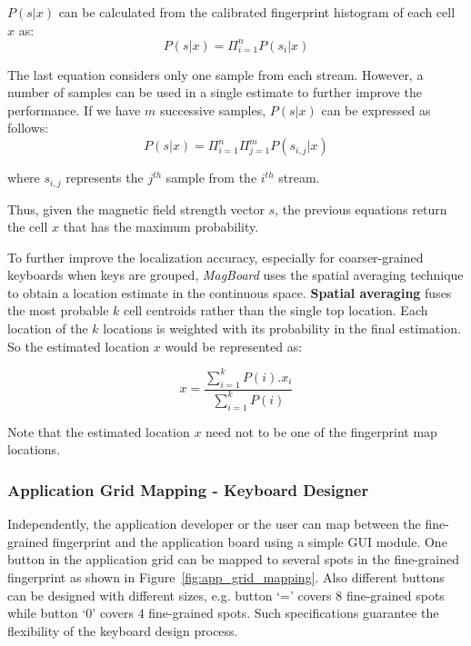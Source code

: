 \documentclass[conference]{IEEEtran}
\def \sys {\textit{MagBoard}}
\begin{document}
$P(s|x)$ can be calculated from the calibrated fingerprint histogram of each cell $x$ as:
\begin{equation}
P(s|x) = \Pi^n_{i=1} P(s_{i}|x)
\end{equation}

The last equation considers only one sample from each stream. However, a number of samples can be used in a single estimate to further improve the performance. If we have $m$ successive samples, $P(s|x)$ can be expressed as follows:
\begin{equation}
P(s|x) = \Pi^n_{i=1}\Pi^m_{j=1} P(s_{i,j}|x)
\label{equ:sample_stream}
\end{equation}

where $s_{i,j}$ represents the $j^{th}$ sample from the $i^{th}$ stream.

Thus, given the magnetic field strength vector $s$, the previous equations return the cell $x$ that has the maximum probability.

To further improve the localization accuracy, especially for coarser-grained keyboards when keys are grouped, \sys{} uses the spatial averaging technique to obtain a location estimate in the continuous space. \textbf{Spatial averaging} fuses the most probable $k$ cell centroids rather than the single top location. Each location of the $k$ locations is weighted with its probability in the final estimation. So the estimated location $x$ would be represented as:

\begin{equation}
x = \frac{\sum^{k}_{i=1} P(i).x_i}{\sum^{k}_{i=1} P(i)}
\end{equation}

Note that the estimated location $x$ need not to be one of the fingerprint map locations.

\subsubsection{Application Grid Mapping - Keyboard Designer}
Independently, the application developer or the user can map between the fine-grained fingerprint and the application board using a simple GUI module. One button in the application grid can be mapped to several spots in the fine-grained fingerprint as shown in Figure~\ref{fig:app_grid_mapping}. Also different buttons can be designed with different sizes, e.g. button `=' covers $8$ fine-grained spots while button `0' covers $4$ fine-grained spots. Such specifications guarantee the flexibility of the keyboard design process.
\end{document}
